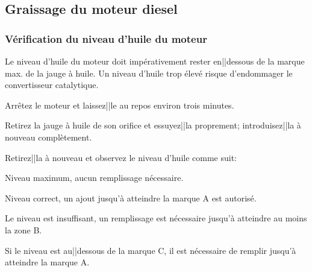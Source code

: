 \subsection [sSec:vw:lub] {Graissage du moteur diesel}

\subsubsection [ssSec:vw:oilLevel] {Vérification du niveau d’huile du moteur}

\starttextbackground [FC]
\startPictPar
\PMrtfm
\PictPar
Le niveau d’huile du moteur doit impérativement rester en||dessous de la marque {\CAP max.} de la jauge à huile.
Un niveau d’huile trop élevé risque d’endommager le convertisseur catalytique.
\stopPictPar
\stoptextbackground

\startSteps
\item Arrêtez le moteur et laissez||le au repos environ trois minutes.
\item Retirez la jauge à huile de son orifice
et essuyez||la proprement; introduisez||la à nouveau complètement.
\item Retirez||la à nouveau et observez le niveau d’huile comme suit:
\startitemize [A]
\item Niveau maximum, aucun remplissage nécessaire.
\item Niveau correct, un ajout jusqu’à atteindre la marque A est autorisé.
\item Le niveau est insuffisant, un remplissage est nécessaire jusqu’à atteindre
au moins la zone B.
\stopitemize
\item Si le niveau est au||dessous de la marque C, il est nécessaire de remplir
jusqu’à atteindre la marque A.
\stopSteps





\stopsection

